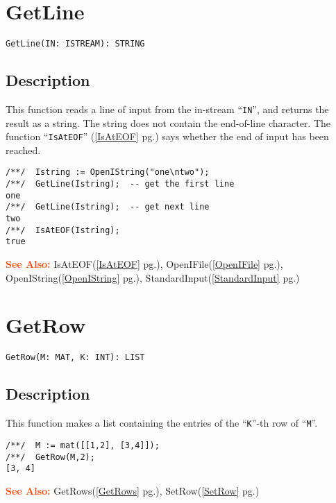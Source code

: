 \documentclass[a4paper]{mybook}
\newenvironment{command}{}{} %
\newcommand\SeeAlso{\par\textcolor{OrangeRed}{\textbf{\large See Also: }}}
\begin{document}
\section{GetLine}
\label{GetLine}
\begin{command} %


\begin{Verbatim}[label=syntax, rulecolor=\color{MidnightBlue},
frame=single]
GetLine(IN: ISTREAM): STRING
\end{Verbatim}


\subsection*{Description}

This function reads a line of input from the in-stream ``\verb&IN&'', and returns
the result as a string.  The string does not contain the end-of-line
character.  The function ``\verb&IsAtEOF&'' (\ref{IsAtEOF} pg.\pageref{IsAtEOF}) says whether the end of input has
been reached.
\begin{Verbatim}[label=example, rulecolor=\color{PineGreen}, frame=single]
/**/  Istring := OpenIString("one\ntwo");
/**/  GetLine(Istring);  -- get the first line
one
/**/  GetLine(Istring);  -- get next line
two
/**/  IsAtEOF(Istring);
true
\end{Verbatim}


\SeeAlso %
  IsAtEOF(\ref{IsAtEOF} pg.\pageref{IsAtEOF}), 
    OpenIFile(\ref{OpenIFile} pg.\pageref{OpenIFile}), 
    OpenIString(\ref{OpenIString} pg.\pageref{OpenIString}), 
    StandardInput(\ref{StandardInput} pg.\pageref{StandardInput})
\end{command} %

\section{GetRow}
\label{GetRow}
\begin{command} %


\begin{Verbatim}[label=syntax, rulecolor=\color{MidnightBlue},
frame=single]
GetRow(M: MAT, K: INT): LIST
\end{Verbatim}


\subsection*{Description}

This function makes a list containing the entries of the ``\verb&K&''-th row of ``\verb&M&''.
\begin{Verbatim}[label=example, rulecolor=\color{PineGreen}, frame=single]
/**/  M := mat([[1,2], [3,4]]);
/**/  GetRow(M,2);
[3, 4]
\end{Verbatim}


\SeeAlso %
  GetRows(\ref{GetRows} pg.\pageref{GetRows}), 
    SetRow(\ref{SetRow} pg.\pageref{SetRow})
\end{command} %
\end{document}
